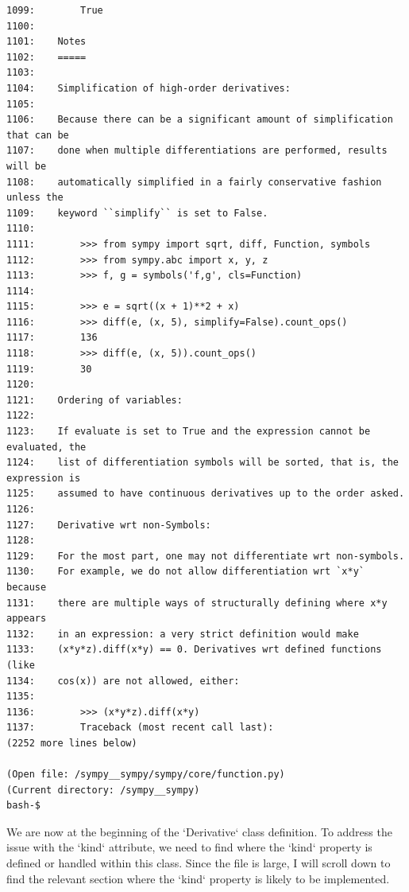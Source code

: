 {\begin{observationbox}
\begin{Verbatim}[breaklines=true, breakanywhere=true]
1099:        True
1100:
1101:    Notes
1102:    =====
1103:
1104:    Simplification of high-order derivatives:
1105:
1106:    Because there can be a significant amount of simplification that can be
1107:    done when multiple differentiations are performed, results will be
1108:    automatically simplified in a fairly conservative fashion unless the
1109:    keyword ``simplify`` is set to False.
1110:
1111:        >>> from sympy import sqrt, diff, Function, symbols
1112:        >>> from sympy.abc import x, y, z
1113:        >>> f, g = symbols('f,g', cls=Function)
1114:
1115:        >>> e = sqrt((x + 1)**2 + x)
1116:        >>> diff(e, (x, 5), simplify=False).count_ops()
1117:        136
1118:        >>> diff(e, (x, 5)).count_ops()
1119:        30
1120:
1121:    Ordering of variables:
1122:
1123:    If evaluate is set to True and the expression cannot be evaluated, the
1124:    list of differentiation symbols will be sorted, that is, the expression is
1125:    assumed to have continuous derivatives up to the order asked.
1126:
1127:    Derivative wrt non-Symbols:
1128:
1129:    For the most part, one may not differentiate wrt non-symbols.
1130:    For example, we do not allow differentiation wrt `x*y` because
1131:    there are multiple ways of structurally defining where x*y appears
1132:    in an expression: a very strict definition would make
1133:    (x*y*z).diff(x*y) == 0. Derivatives wrt defined functions (like
1134:    cos(x)) are not allowed, either:
1135:
1136:        >>> (x*y*z).diff(x*y)
1137:        Traceback (most recent call last):
(2252 more lines below)

(Open file: /sympy__sympy/sympy/core/function.py)
(Current directory: /sympy__sympy)
bash-$
\end{Verbatim}
\end{observationbox}
\begin{agentbox}
We are now at the beginning of the `Derivative` class definition. To address the issue with the `kind` attribute, we need to find where the `kind` property is defined or handled within this class. Since the file is large, I will scroll down to find the relevant section where the `kind` property is likely to be implemented.




\end{agentbox}}
